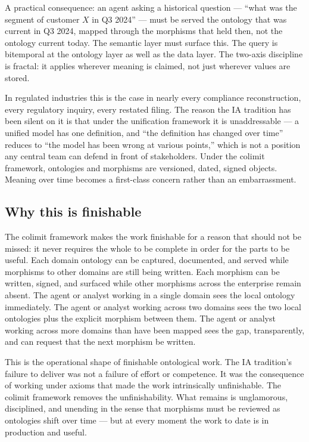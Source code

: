 \documentclass[11pt,a4paper]{article}
\begin{document}
A practical consequence: an agent asking a historical question --- ``what was the segment of customer $X$ in Q3 2024'' --- must be served the ontology that was current in Q3 2024, mapped through the morphisms that held then, not the ontology current today. The semantic layer must surface this. The query is bitemporal at the ontology layer as well as the data layer. The two-axis discipline is fractal: it applies wherever meaning is claimed, not just wherever values are stored.

In regulated industries this is the case in nearly every compliance reconstruction, every regulatory inquiry, every restated filing. The reason the IA tradition has been silent on it is that under the unification framework it is unaddressable --- a unified model has one definition, and ``the definition has changed over time'' reduces to ``the model has been wrong at various points,'' which is not a position any central team can defend in front of stakeholders. Under the colimit framework, ontologies and morphisms are versioned, dated, signed objects. Meaning over time becomes a first-class concern rather than an embarrassment.

\subsection{Why this is finishable}

The colimit framework makes the work finishable for a reason that should not be missed: it never requires the whole to be complete in order for the parts to be useful. Each domain ontology can be captured, documented, and served while morphisms to other domains are still being written. Each morphism can be written, signed, and surfaced while other morphisms across the enterprise remain absent. The agent or analyst working in a single domain sees the local ontology immediately. The agent or analyst working across two domains sees the two local ontologies plus the explicit morphism between them. The agent or analyst working across more domains than have been mapped sees the gap, transparently, and can request that the next morphism be written.

This is the operational shape of finishable ontological work. The IA tradition's failure to deliver was not a failure of effort or competence. It was the consequence of working under axioms that made the work intrinsically unfinishable. The colimit framework removes the unfinishability. What remains is unglamorous, disciplined, and unending in the sense that morphisms must be reviewed as ontologies shift over time --- but at every moment the work to date is in production and useful.
\end{document}
